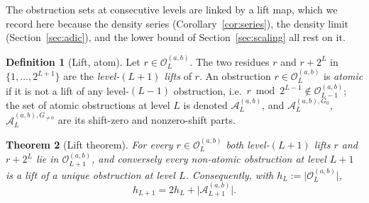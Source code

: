 \documentclass[11pt,reqno]{amsart}
\theoremstyle{plain}
\newtheorem{theorem}{Theorem}[section]
\theoremstyle{definition}
\newtheorem{definition}[theorem]{Definition}
\theoremstyle{remark}
\newcommand{\Obs}{\mathcal{O}}
\newcommand{\Atom}{\mathcal{A}}
\newcommand{\Obsab}{\Obs_{L}^{(a,b)}}
\newcommand{\Atomab}{\Atom_{L}^{(a,b)}}
\begin{document}
The obstruction sets at consecutive levels are linked by a lift map,
which we record here because the density series
(Corollary~\ref{cor:series}), the density limit
(Section~\ref{sec:adic}), and the lower bound of
Section~\ref{sec:scaling} all rest on it.

\begin{definition}[Lift, atom]\label{def:atom}
Let $r \in \Obsab$. The two residues $r$ and $r + 2^L$ in
$\{1, \ldots, 2^{L+1}\}$ are the \emph{level-$(L+1)$ lifts} of $r$. An
obstruction $r \in \Obsab$ is \emph{atomic} if it is not a lift of any
level-$(L-1)$ obstruction, i.e.\ $r \bmod 2^{L-1} \notin
\Obs_{L-1}^{(a,b)}$; the set of atomic obstructions at level $L$ is
denoted $\Atomab$, and $\Atom_L^{(a,b), G_0}$, $\Atom_L^{(a,b), G_{\ne 0}}$
are its shift-zero and nonzero-shift parts.
\end{definition}

\begin{theorem}[Lift theorem]\label{thm:lift}
For every $r \in \Obsab$ both level-$(L+1)$ lifts $r$ and $r + 2^L$ lie in
$\Obs_{L+1}^{(a,b)}$, and conversely every non-atomic obstruction at level
$L+1$ is a lift of a unique obstruction at level $L$. Consequently, with
$h_L := \lvert \Obsab \rvert$,
\[
h_{L+1} = 2 h_L + \lvert \Atom_{L+1}^{(a,b)} \rvert.
\]
\end{theorem}
\end{document}
